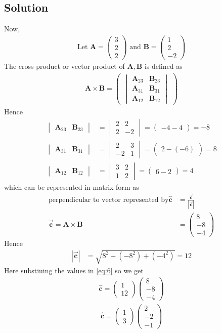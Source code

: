 \documentclass[12pt]{article}
\newcommand{\mydet}[1]{\ensuremath{\begin{vmatrix}#1\end{vmatrix}}}
\providecommand{\abs}[1]{\left\vert#1\right\vert}
\newcommand{\myvec}[1]{\ensuremath{\begin{pmatrix}#1\end{pmatrix}}}
\let\vec\mathbf
\begin{document}
\begin{enumerate}
\section{Solution}
Now,
\begin{align}
\text{Let } \vec{A} = \myvec{3\\2\\2} \text{ and } \vec{B} = \myvec{1\\ 2 \\ -2}
\end{align}
The cross product or vector product of $\vec{A},\vec{B}$ is defined as
\begin{align}
 \vec{A} \times \vec{B} = \myvec{\mydet{\vec{A}_{23}&\vec{B}_{23}\\\vec{A}_{31}&\vec{B}_{31}\\\vec{A}_{12}&\vec{B}_{12}}}
\end{align}
Hence
\begin{align}
 \mydet{\vec{A}_{23}&\vec{B}_{23}}&=\mydet{2&2\\2&-2}=\myvec{-4-4}=-8\\
 \mydet{\vec{A}_{31}&\vec{B}_{31}}&=\mydet{2&3\\-2&1}=\myvec{2-(-6)}=8\\
 \mydet{\vec{A}_{12}&\vec{B}_{12}}&=\mydet{3&2\\1&2}=\myvec{6-2}=4
\end{align}
which can be represented in matrix form as
\begin{align}
\text{perpendicular to vector represented by}
\hat{\vec{c}} &=\frac{\overrightarrow{\vec{c}}}{\abs{\overrightarrow{\vec{c}}}} \label{eq:6}\\
\overrightarrow{\vec{c}}=\vec{A} \times \vec{B}&=\myvec{8\\-8\\-4} 
\end{align}
Hence
\begin{align}
\abs{\overrightarrow{\vec{c}}}&={\sqrt{8^2+(-8^2)+(-4^2)}}=12  
\end{align}
Here substiuing the values in \eqref{eq:6} so we get
\begin{align}
\hat{\vec{c}}=\myvec{1\\12}\myvec{8\\-8\\-4}
\end{align}
\begin{align}
\hat{\vec{c}}=\myvec{1\\3}\myvec{2\\-2\\-1}
\end{align}
\end{enumerate}
\end{document}

